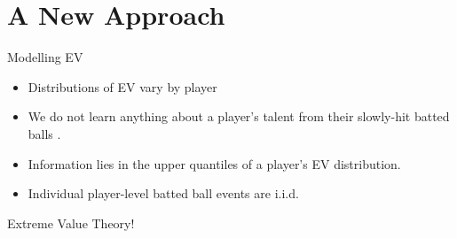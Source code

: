 \documentclass{beamer}
\begin{document}
\section{A New Approach}
\begin{frame}{Modelling EV}
    \begin{itemize}
        \item Distributions of EV vary by player
        \item We do not learn anything about a player's talent from their slowly-hit batted balls \cite{tangoBestSpeed}.
        \item Information lies in the upper quantiles of a player's EV distribution.
        \item Individual player-level batted ball events are i.i.d.
    \end{itemize}
    Extreme Value Theory!
\end{frame}
\end{document}
